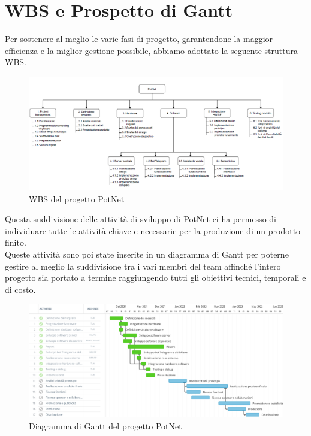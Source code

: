 \newpage
\section{WBS e Prospetto di Gantt}

Per sostenere al meglio le varie fasi di progetto, garantendone la maggior efficienza e la miglior gestione possibile, abbiamo adottato la seguente struttura WBS.

\begin{figure}[ht!]
	\centering
	\includegraphics[width=\textwidth]{./images/wbs.PNG} 
	\caption{WBS del progetto PotNet \label{overflow}}
\end{figure}

Questa suddivisione delle attività di sviluppo di PotNet ci ha permesso di individuare tutte le attività chiave e necessarie per la produzione di un prodotto finito.\\
Queste attività sono poi state inserite in un diagramma di Gantt per poterne gestire al meglio la suddivisione tra i vari membri del team affinché l'intero progetto sia portato a termine raggiungendo tutti gli obiettivi tecnici, temporali e di costo.

\begin{figure}[ht!]
	\centering
	\includegraphics[angle=0,origin=c,width=\textwidth]{./images/Gannt.PNG} 
	\caption{Diagramma di Gantt del progetto PotNet \label{overflow}}
\end{figure}

\newpage
\theendnotes